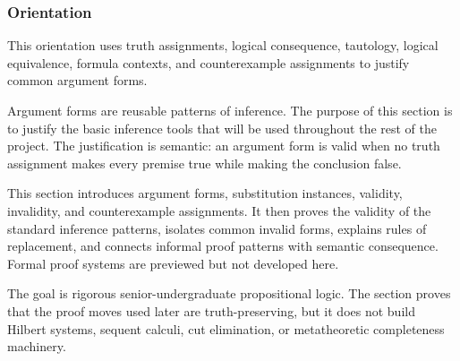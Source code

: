 \subsubsection*{Orientation}

\begin{remark*}
This orientation uses truth assignments, logical consequence, tautology,
logical equivalence, formula contexts, and counterexample assignments to justify
common argument forms.
\end{remark*}

\begin{remark*}[Exposition]
Argument forms are reusable patterns of inference. The purpose of this section
is to justify the basic inference tools that will be used throughout the rest of
the project. The justification is semantic: an argument form is valid when no
truth assignment makes every premise true while making the conclusion false.
\end{remark*}

\begin{remark*}
This section introduces argument forms, substitution instances, validity,
invalidity, and counterexample assignments. It then proves the validity of the
standard inference patterns, isolates common invalid forms, explains rules of
replacement, and connects informal proof patterns with semantic consequence.
Formal proof systems are previewed but not developed here.
\end{remark*}

\begin{remark*}[Boundary]
The goal is rigorous senior-undergraduate propositional logic. The section
proves that the proof moves used later are truth-preserving, but it does not
build Hilbert systems, sequent calculi, cut elimination, or metatheoretic
completeness machinery.
\end{remark*}

